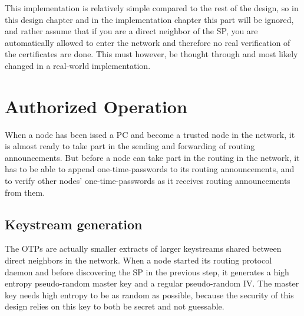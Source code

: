 This implementation is relatively simple compared to the rest of the design, so
in this design chapter and in the implementation chapter this part will be
ignored, and rather assume that if you are a direct neighbor of the \ac{SP}, you
are automatically allowed to enter the network and therefore no real
verification of the certificates are done. This must however, be thought through
and most likely changed in a real-world implementation.

\section{Authorized Operation}



When a node has been issed a \ac{PC} and become a trusted node in the network,
it is almost ready to take part in the sending and forwarding of routing
announcements. But before a node can take part in the routing in the network, it
has to be able to append one-time-passwords to its routing announcements, and to
verify other nodes' one-time-passwords as it receives routing announcements from
them.

\subsection{Keystream generation}
The \acp{OTP} are actually smaller extracts of larger keystreams shared
between direct neighbors in the network. When a node started its routing
protocol daemon and before discovering the \ac{SP} in the previous step, it
generates a high entropy pseudo-random master key and a regular pseudo-random
\ac{IV}. The master key needs high entropy to be as random as possible, because
the security of this design relies on this key to both be secret and not
guessable.

